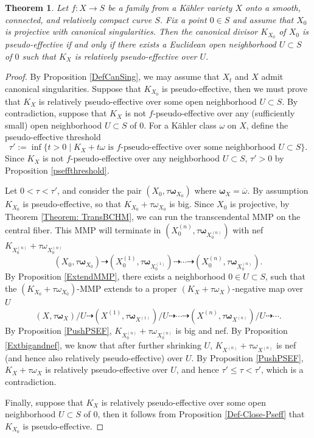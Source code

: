 \documentclass[12pt]{amsart}
\numberwithin{equation}{section}
\newtheorem{theorem} {Theorem} [section]
\theoremstyle{definition}
\theoremstyle{plain}
\newtheorem*{thm A*}{Theorem A}
\newtheorem*{thm B*}{Theorem B}
\newtheorem*{thm C*}{Theorem C}
\newtheorem*{thm D*}{Theorem D}
\theoremstyle{definition}
\renewcommand{\1}{\mathds{1}}
\renewcommand{\>}{\rightarrow}
\begin{document}
\begin{theorem}\label{Deformation invariance of pseudo-effectivity}
Let $f: X \to S$ be a family from a  K\"ahler variety $X$ onto a smooth, connected, and relatively compact curve $S$. Fix a point $0\in S$ and assume that $X_0$ is projective with canonical singularities. Then the canonical divisor $K_{X_0}$ of $X_0$ is pseudo-effective if and only if there exists a Euclidean open neighborhood $U \subset S$ of $0$ such that $K_{X}$ is relatively pseudo-effective over $U$.
\end{theorem}
\begin{proof}By Proposition \ref{DefCanSing}, we may assume that ${X_t}$ and $X$ admit canonical singularities. Suppose that $K_{X_0}$ is pseudo-effective, then we must prove that $K_X$ is relatively pseudo-effective over some open neighborhood $U\subset S$. By contradiction, suppose that $K_X $ is not $f$-pseudo-effective over any (sufficiently small) open neighborhood $U\subset S$ of $0$. For a K\"ahler class $\omega$ on $X$, define the pseudo-effective threshold  $$\tau':= \inf\{t>0 \mid K_X+ t \omega \text{ is }f\text{-pseudo-effective over some neighborhood }U\subset S\}.$$ 
Since $K_X$ is not $f$-pseudo-effective over any neighborhood $U \subset S$, $\tau '>0$ by Proposition \ref{pseffthreshold}. 

Let $0< \tau < \tau '$, and consider the pair $(X_0,  \tau \boldsymbol{\omega}_{X_0})$ where $\boldsymbol{\omega}_{X}=\overline \omega$. By assumption $K_{X_0} $ is pseudo-effective, so that $K_{X_0} + \tau {{\omega}}_{X_0}$ is big. Since $X_0$ is projective, by Theorem \ref{Theorem: TransBCHM}, we can run the transcendental MMP on the central fiber. This MMP will terminate in $(X_0^{(n)} ,   \tau \boldsymbol{\omega}_{X_0^{(n)}})$ with nef $K_{X_0^{(n)} }+  \tau {\omega}_{X^{(n)}_0}$ 
$$(X_0,   \tau \boldsymbol{\omega}_{X_0}) \dashrightarrow (X^{(1)}_0 ,  \tau \boldsymbol{\omega}_{X_0^{(1)}}) \dashrightarrow \cdots \dashrightarrow (X^{(n)}_0,  \tau \boldsymbol{\omega}_{X_0^{(n)}}).$$ 
By Proposition \ref{ExtendMMP}, there exists a neighborhood $0\in U\subset S$, such that the $(K_{X_0}+ \tau {\omega}_{X_0})$-MMP extends to a proper $(K_X  +\tau{{\omega}}_X)$-negative map over $U$
$$(X, \tau \boldsymbol{\omega}_X) /U\dashrightarrow (X^{(1)},  \tau\boldsymbol{ \omega}_{X^{(1)}}) /U\dashrightarrow \cdots \dashrightarrow (X^{(n)}, \tau \boldsymbol{\omega}_{X^{(n)}})/U\dashrightarrow \cdots.$$
By Proposition \ref{PushPSEF}, $K_{X_0^{(n)}}  + \tau {\omega}_{X_0^{(n)}}$ is big and nef. By Proposition \ref{Extbigandnef}, we know that after further shrinking $U$, $K_{X^{(n)}}  + \tau {\omega}_{X^{(n)}}$ is nef (and hence also relatively pseudo-effective) over $U$. By Proposition \ref{PushPSEF}, $K_{X} + \tau {\omega}_X$ is relatively pseudo-effective over $U$, and hence $\tau' \le \tau < \tau'$, which is a contradiction. 

Finally, suppose that $K_X$ is relatively pseudo-effective over some open neighborhood $U\subset S$ of $0$, then it follows from Proposition \ref{Def-Close-Pseff} that $K_{X_0}$ is pseudo-effective.
\end{proof}
\end{document}
